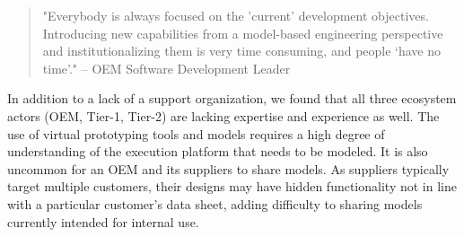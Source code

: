 \begin{quote}
"Everybody is always focused on the 'current' development objectives.
Introducing new capabilities from a model-based engineering perspective and institutionalizing them is very time consuming, and people ‘have no time’." 
-- OEM Software Development Leader
\end{quote}

In addition to a lack of a support organization, we found that all three ecosystem actors (OEM, Tier-1, Tier-2) are lacking expertise and experience as well.
The use of virtual prototyping tools and models requires a high degree of understanding of the execution platform that needs to be modeled.
%
%
It is also uncommon for an OEM and its suppliers to share models.
As suppliers typically target multiple customers, their designs may have hidden functionality not in line with a particular customer’s data sheet,
adding difficulty to sharing models currently intended for internal use.



